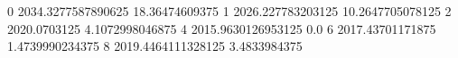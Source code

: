 0 2034.3277587890625 18.36474609375
1 2026.227783203125 10.2647705078125
2 2020.0703125 4.1072998046875
4 2015.9630126953125 0.0
6 2017.43701171875 1.4739990234375
8 2019.4464111328125 3.4833984375
